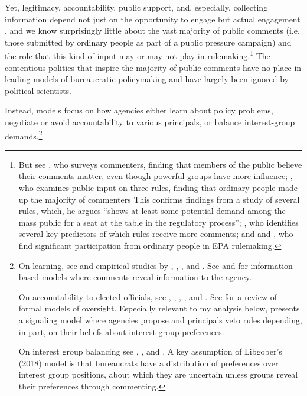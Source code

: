 Yet, legitimacy, accountability, public support, and, especially, collecting information depend not just on the opportunity to engage but actual engagement \citep{Herz2018}, and we know surprisingly little about the vast majority of public comments (i.e. those submitted by ordinary people as part of a public pressure campaign) and the role that this kind of input may or may not play in rulemaking.\footnote{ 
But see \citet{Yackee2015JPART}, who surveys commenters, finding that members of the public believe their comments matter, even though powerful groups have more influence; \citet{Cuellar2005}, who examines public input on three rules, finding that ordinary people made up the majority of commenters This confirms findings from a study of several rules, which, he argues ``shows at least some potential demand among the mass public for a seat at the table in the regulatory process''; \citet{Moore2017}, who identifies several key predictors of which rules receive more comments; and \citet{Balla2018} and \citet{Potter2017}, who find significant participation from ordinary people in EPA rulemaking. 
}
The contentious politics that inspire the majority of public comments have no place in leading models of bureaucratic policymaking and have largely been ignored by political scientists.

Instead, models focus on how agencies either learn about policy problems, negotiate or avoid accountability to various principals, or balance interest-group demands.\footnote{
On learning, see \citet{Kerwin2011} and empirical studies by \citet{yackee2012}, \citet{Cook2017}, \citep{Gordon2018}, and \citet{Walters2019}. See \citet{Gailmard2017} and \citet{Libgober2018} for information-based models where comments reveal information to the agency. 

On accountability to elected officials, see  \citet{Furlong1997}, \citet{Nou2016}, \citet{Potter2016}, \citet{Woods2018}, and \citet{Yackee2009RegGov}. See \cite{Gailmard2012} for a review of formal models of oversight.
Especially relevant to my analysis below, \citet{Potter2014dis} presents a signaling model where agencies propose and principals veto rules depending, in part, on their beliefs about interest group preferences. 

On interest group balancing see \citet{Yackee2006JOP},  \citet{Yackee2006JPART}, and \citet{Kerwin2011}. A key assumption of Libgober's (2018) model is that bureaucrats have a distribution of preferences over interest group positions, about which they are uncertain unless groups reveal their preferences through commenting.
} 

